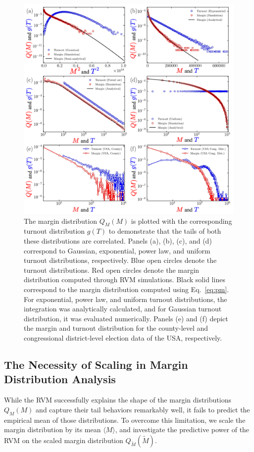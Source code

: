 \begin{figure}[H]
    \centering
    \includegraphics[width=\textwidth]{chapters/chapter5/margin_turnout_dists.pdf}
    \caption{The margin distribution $Q_M(M)$ is plotted with the corresponding turnout distribution $g(T)$ to demonstrate that the tails of both these distributions are correlated. Panels (a), (b), (c), and (d) correspond to Gaussian, exponential, power law, and uniform turnout distributions, respectively. Blue open circles denote the turnout distributions. Red open circles denote the margin distribution computed through RVM simulations. Black solid lines correspond to the margin distribution computed using Eq.~\ref{eq:pm}. For exponential, power law, and uniform turnout distributions, the integration was analytically calculated, and for Gaussian turnout distribution, it was evaluated numerically. Panels (e) and (f) depict the margin and turnout distribution for the county-level and congressional district-level election data of the USA, respectively.}
    \label{fig:margin_turnout_dists}
\end{figure}
\subsection{The Necessity of Scaling in Margin Distribution Analysis}
While the RVM successfully explains the shape of the margin distributions $Q_M(M)$ and capture their tail behaviors remarkably well, it fails to predict the empirical mean of those distributions. To overcome this limitation, we scale the margin distribution by its mean $\langle M \rangle$, and investigate the predictive power of the RVM on the scaled margin distribution $Q_{\widetilde{M}}(\widetilde{M})$.
